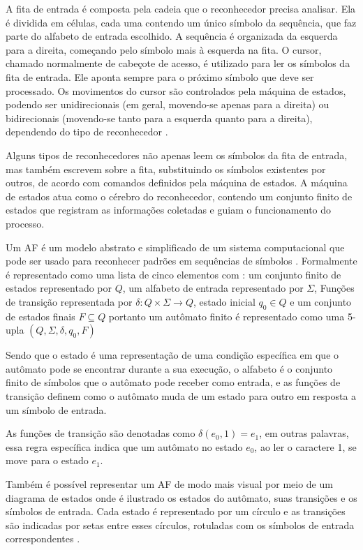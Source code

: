 A fita de entrada é composta pela cadeia que o reconhecedor precisa analisar. Ela é dividida em células, cada uma contendo um único símbolo da sequência, que faz parte do alfabeto de entrada escolhido. A sequência é organizada da esquerda para a direita, começando pelo símbolo mais à esquerda na fita. O cursor, chamado normalmente de cabeçote de acesso, é utilizado para ler os símbolos da fita de entrada. Ele aponta sempre para o próximo símbolo que deve ser processado. Os movimentos do cursor são controlados pela máquina de estados, podendo ser unidirecionais (em geral, movendo-se apenas para a direita) ou bidirecionais (movendo-se tanto para a esquerda quanto para a direita), dependendo do tipo de reconhecedor \cite{reconhecimento}.

Alguns tipos de reconhecedores não apenas leem os símbolos da fita de entrada, mas também escrevem sobre a fita, substituindo os símbolos existentes por outros, de acordo com comandos definidos pela máquina de estados. A máquina de estados atua como o cérebro do reconhecedor, contendo um conjunto finito de estados que registram as informações coletadas e guiam o funcionamento do processo\cite{reconhecimento}.


Um \ac{AF} é um modelo abstrato e simplificado de um sistema computacional que pode ser usado para reconhecer padrões em sequências de símbolos \cite{afd}. Formalmente é representado como uma lista de cinco elementos  com : 
um conjunto finito de estados representado por $Q$, um alfabeto de entrada representado por $\Sigma$, Funções de transição representada por $\delta : Q \times \Sigma \rightarrow Q$, estado inicial $q_0 \in Q$ e um conjunto de estados finais $F \subseteq Q$ portanto um autômato finito é representado como uma 5-upla $(Q, \Sigma, \delta, q_0, F)$

Sendo que o estado é uma representação de uma condição específica em que o autômato pode se encontrar durante a sua execução, o alfabeto é o conjunto finito de símbolos que o autômato pode receber como entrada, e as funções de transição definem como o autômato muda de um estado para outro em resposta a um símbolo de entrada.

As funções de transição são denotadas como $\delta(e_0, 1) = e_1$, em outras palavras, essa regra específica indica que um autômato no estado $e_0$, ao ler o caractere 1, se move para o estado $e_1$.

Também é possível representar um \ac{AF} de modo mais visual por meio de um diagrama de estados onde é ilustrado os estados do autômato, suas transições e os símbolos de entrada. Cada estado é representado por um círculo e as transições são indicadas por setas entre esses círculos, rotuladas com os símbolos de entrada correspondentes \cite{afd}.

